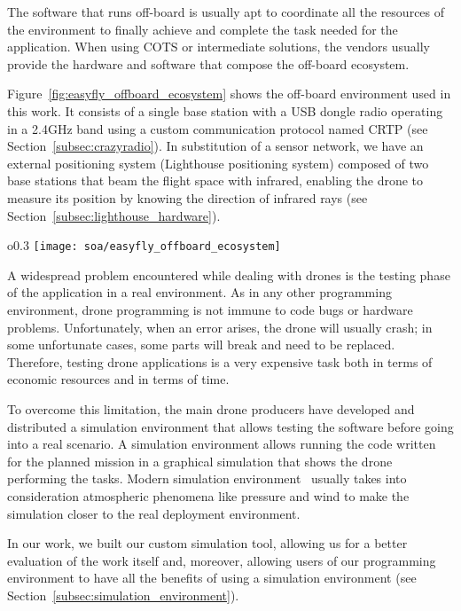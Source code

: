 The software that runs off-board is usually apt to coordinate all the resources of the environment to finally achieve and 
complete the task needed for the application. When using COTS or intermediate solutions, the vendors usually provide the 
hardware and software that compose the off-board ecosystem.

Figure~\ref{fig:easyfly_offboard_ecosystem} shows the off-board environment used in this work. 
It consists of a single base station with a USB dongle radio operating in a 2.4GHz band using a custom communication protocol named CRTP (see Section~\ref{subsec:crazyradio}). 
In substitution of a sensor network, we have an external positioning system (Lighthouse positioning system) composed of two base stations that beam the flight space with infrared, enabling the drone to measure its position by knowing the direction of infrared rays (see Section~\ref{subsec:lighthouse_hardware}).

\begin{wrapfigure}{o}{0.3\textwidth}
    \texttt{[image: soa/easyfly\_offboard\_ecosystem]}
    \caption{EasyFly off-board ecosystem.}\label{fig:easyfly_offboard_ecosystem}
\end{wrapfigure}

A widespread problem encountered while dealing with drones is the testing phase of the application in a real environment. 
As in any other programming environment, drone programming is not immune to code bugs or hardware problems. 
Unfortunately, when an error arises, the drone will usually crash; in some unfortunate cases, some parts will break and need to be replaced. 
Therefore, testing drone applications is a very expensive task both in terms of economic resources and in terms of time. 

To overcome this limitation, the main drone producers have developed and distributed a simulation environment that allows 
testing the software before going into a real scenario. 
A simulation environment allows running the code written for the planned mission in a graphical simulation that shows the drone performing the tasks. 
Modern simulation environment~\cite{sphinx, DIJflightSimulator} usually takes into consideration atmospheric phenomena like pressure and wind to make the simulation 
closer to the real deployment environment.

In our work, we built our custom simulation tool, allowing us for a better evaluation of the work itself and, moreover, allowing  
users of our programming environment to have all the benefits of using a simulation environment (see Section~\ref{subsec:simulation_environment}).

